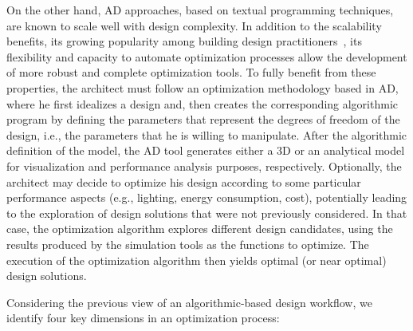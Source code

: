 On the other hand, \ac{AD} approaches, based on textual programming techniques, are known to scale well with design complexity. In addition to the scalability benefits, its growing popularity among building design practitioners~\cite{Kestelier2013}, its flexibility and capacity to automate optimization processes allow the development of more robust and complete optimization tools. To fully benefit from these properties, the architect must follow an optimization methodology based in \ac{AD}, where he first idealizes a design and, then creates the corresponding algorithmic program by defining the parameters that represent the degrees of freedom of the design, i.e., the parameters that he is willing to manipulate. After the algorithmic definition of the model, the \ac{AD} tool generates either a 3D or an analytical model for visualization and performance analysis purposes, respectively. Optionally, the architect may decide to optimize his design according to some particular performance aspects (e.g., lighting, energy consumption, cost), potentially leading to the exploration of design solutions that were not previously considered. In that case, the optimization algorithm explores different design candidates, using the results produced by the simulation tools as the functions to optimize. The execution of the optimization algorithm then yields optimal (or near optimal) design solutions.

Considering the previous view of an algorithmic-based design workflow, we identify four key dimensions in an optimization process:

